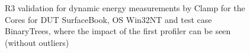 \begin{figure}
                            \caption{R3 validation for dynamic energy measurements by Clamp for the Cores for DUT SurfaceBook, OS Win32NT and test case BinaryTrees, where the impact of the first profiler can be seen (without outliers)} \label{fig:SurfaceBook_Clamp_Cores_R3_dynamic_energy_without_outliers_Win32NT_avg_watts}
                            \end{figure}
                            